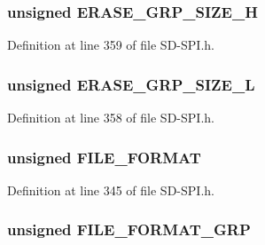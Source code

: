 \subsubsection[{E\+R\+A\+S\+E\+\_\+\+G\+R\+P\+\_\+\+S\+I\+Z\+E\+\_\+\+H}]{\setlength{\rightskip}{0pt plus 5cm}unsigned E\+R\+A\+S\+E\+\_\+\+G\+R\+P\+\_\+\+S\+I\+Z\+E\+\_\+\+H}\label{union_c_s_d_ade2242b8fbe922df9894d9cbd9e2d147}


Definition at line 359 of file S\+D-\/\+S\+P\+I.\+h.

\hypertarget{union_c_s_d_ae06e0a15e6038bcc05b8819004f17bde}{}
\subsubsection[{E\+R\+A\+S\+E\+\_\+\+G\+R\+P\+\_\+\+S\+I\+Z\+E\+\_\+\+L}]{\setlength{\rightskip}{0pt plus 5cm}unsigned E\+R\+A\+S\+E\+\_\+\+G\+R\+P\+\_\+\+S\+I\+Z\+E\+\_\+\+L}\label{union_c_s_d_ae06e0a15e6038bcc05b8819004f17bde}


Definition at line 358 of file S\+D-\/\+S\+P\+I.\+h.

\hypertarget{union_c_s_d_a4d5c9caba6937b22fc28097555b0d5f7}{}
\subsubsection[{F\+I\+L\+E\+\_\+\+F\+O\+R\+M\+A\+T}]{\setlength{\rightskip}{0pt plus 5cm}unsigned F\+I\+L\+E\+\_\+\+F\+O\+R\+M\+A\+T}\label{union_c_s_d_a4d5c9caba6937b22fc28097555b0d5f7}


Definition at line 345 of file S\+D-\/\+S\+P\+I.\+h.

\hypertarget{union_c_s_d_a2cc5d30eb399d2bb76b00f60b9e58d3c}{}
\subsubsection[{F\+I\+L\+E\+\_\+\+F\+O\+R\+M\+A\+T\+\_\+\+G\+R\+P}]{\setlength{\rightskip}{0pt plus 5cm}unsigned F\+I\+L\+E\+\_\+\+F\+O\+R\+M\+A\+T\+\_\+\+G\+R\+P}\label{union_c_s_d_a2cc5d30eb399d2bb76b00f60b9e58d3c}


